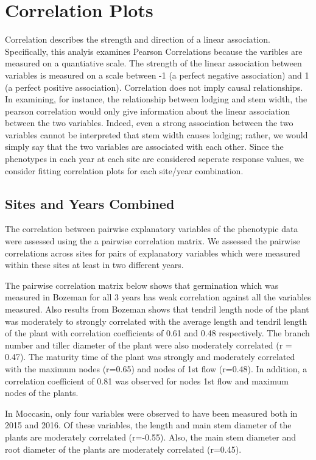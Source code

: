 \documentclass[11pt]{article}
\begin{document}
\section{Correlation Plots}
Correlation describes the strength and direction of a linear association. Specifically, this analyis examines Pearson Correlations because the varibles are measured on a quantiative scale.  The strength of the linear association between variables is measured on a scale between -1 (a perfect negative association) and 1 (a perfect positive association). Correlation does not imply causal relationships. In examining, for instance, the relationship between lodging and stem width, the pearson correlation would only give information about the linear association between the two variables.  Indeed, even a strong association between the two variables cannot be interpreted that stem width causes lodging; rather, we would simply say that the two variables are associated with each other.  Since the phenotypes in each year at each site are considered seperate response values, we consider fitting correlation plots for each site/year combination. 

\subsection{Sites and Years Combined}

The correlation between pairwise explanatory variables of the phenotypic data were assessed using the a pairwise correlation matrix. We assessed the pairwise correlations across sites for pairs of explanatory variables which were measured within these sites at least in two different years.

The pairwise correlation matrix below shows that germination which was measured in Bozeman for all 3 years has weak correlation against all the variables measured. Also results from Bozeman shows that tendril length node of the plant was moderately to strongly correlated with the average length and tendril length of the plant with correlation coefficients of 0.61 and 0.48 respectively. The branch number and tiller diameter of the plant were also moderately correlated (r = 0.47). The maturity time of the plant was strongly and moderately correlated with the maximum nodes (r=0.65) and nodes of 1st flow (r=0.48). In addition, a correlation coefficient of 0.81 was observed for nodes 1st flow and maximum nodes of the plants.

In Moccasin, only four variables were observed to have been measured both in 2015 and 2016. Of these variables, the length and main stem diameter of the plants are moderately correlated (r=-0.55). Also, the main stem diameter and root diameter of the plants are moderately correlated (r=0.45).
\end{document}
